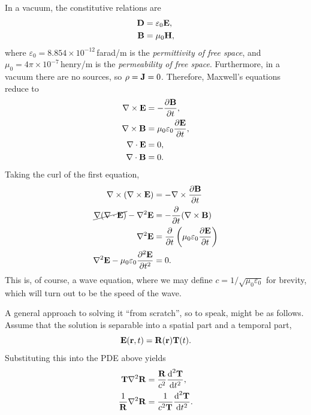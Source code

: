 \documentclass{book}
\newcommand{\derivn}[3]{\frac{\text{d}^{#3}{#1}}{\text{d}{#2}^{#3}}}
\newcommand{\pd}[2]{\frac{\partial {#1}}{\partial {#2}}}
\newcommand{\ppd}[2]{\frac{\partial^2{#1}}{\partial {#2}^2}}
\begin{document}
In a vacuum, the constitutive relations are
\begin{equation}
    \begin{aligned}
        {\bf D} &= \varepsilon_0 {\bf E}, \\
        {\bf B} &= \mu_0 {\bf H},
    \end{aligned}
\end{equation}
where $\varepsilon_0 = 8.854 \times 10^{-12}\,$farad/m is the \textit{permittivity of free space}, and $\mu_0 = 4\pi \times 10^{-7}\,$henry/m is the \textit{permeability of free space}.
Furthermore, in a vacuum there are no sources, so $\rho = {\bf J} = 0$.
Therefore, Maxwell's equations reduce to
\begin{equation}
    \begin{aligned}
        \nabla \times {\bf E} &= -\pd{\bf B}{t}, \\
        \nabla \times {\bf B} &= \mu_0 \varepsilon_0 \pd{\bf E}{t}, \\
        \nabla \cdot {\bf E} &= 0, \\
        \nabla \cdot {\bf B} &= 0.
    \end{aligned}
\end{equation}
Taking the curl of the first equation,
\begin{equation}
    \begin{aligned}
        \nabla \times (\nabla \times {\bf E}) &= -\nabla \times \pd{\bf B}{t} \\
        \cancel{\nabla (\nabla \cdot {\bf E})} - \nabla^2{\bf E} &= -\pd{}{t} (\nabla \times {\bf B}) \\
        \nabla^2 {\bf E}
            &= \pd{}{t} \left( \mu_0 \varepsilon_0 \pd{\bf E}{t} \right) \\
        \nabla^2 {\bf E} - \mu_0 \varepsilon_0 \ppd{\bf E}{t}
            &= 0.
    \end{aligned}
    \label{eqn:maxeq_for_vacuum}
\end{equation}
This is, of course, a wave equation, where we may define $c = 1/\sqrt{\mu_0 \varepsilon_0}$ for brevity, which will turn out to be the speed of the wave.

A general approach to solving it ``from scratch'', so to speak, might be as follows.
Assume that the solution is separable into a spatial part and a temporal part,
\begin{equation}
    {\bf E}({\bf r}, t) = {\bf R}({\bf r}) {\bf T}(t).
\end{equation}
Substituting this into the PDE above yields
\begin{equation}
    \begin{aligned}
        {\bf T} \nabla^2 {\bf R} &= \frac{\bf R}{c^2} \derivn{\bf T}{t}{2}, \\
        \frac{1}{\bf R} \nabla^2 {\bf R} &= \frac{1}{c^2 {\bf T}} \derivn{\bf T}{t}{2}.
    \end{aligned}
\end{equation}
\end{document}
